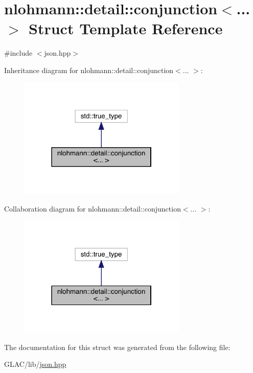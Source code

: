 \hypertarget{structnlohmann_1_1detail_1_1conjunction}{}\section{nlohmann\+::detail\+::conjunction$<$... $>$ Struct Template Reference}
\label{structnlohmann_1_1detail_1_1conjunction}


{\ttfamily \#include $<$json.\+hpp$>$}



Inheritance diagram for nlohmann\+::detail\+::conjunction$<$... $>$\+:\nopagebreak
\begin{figure}[H]
\begin{center}
\leavevmode
\includegraphics[width=226pt]{structnlohmann_1_1detail_1_1conjunction__inherit__graph}
\end{center}
\end{figure}


Collaboration diagram for nlohmann\+::detail\+::conjunction$<$... $>$\+:\nopagebreak
\begin{figure}[H]
\begin{center}
\leavevmode
\includegraphics[width=226pt]{structnlohmann_1_1detail_1_1conjunction__coll__graph}
\end{center}
\end{figure}


The documentation for this struct was generated from the following file\+:\begin{DoxyCompactItemize}
\item 
G\+L\+A\+C/lib/\mbox{\hyperlink{json_8hpp}{json.\+hpp}}\end{DoxyCompactItemize}
